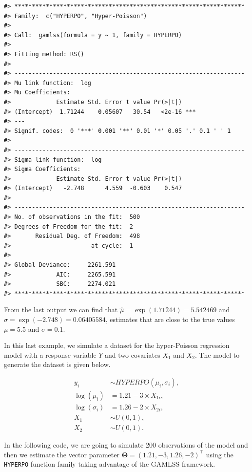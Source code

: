 \begin{verbatim}
#> ******************************************************************
#> Family:  c("HYPERPO", "Hyper-Poisson") 
#> 
#> Call:  gamlss(formula = y ~ 1, family = HYPERPO) 
#> 
#> Fitting method: RS() 
#> 
#> ------------------------------------------------------------------
#> Mu link function:  log
#> Mu Coefficients:
#>             Estimate Std. Error t value Pr(>|t|)    
#> (Intercept)  1.71244    0.05607   30.54   <2e-16 ***
#> ---
#> Signif. codes:  0 '***' 0.001 '**' 0.01 '*' 0.05 '.' 0.1 ' ' 1
#> 
#> ------------------------------------------------------------------
#> Sigma link function:  log
#> Sigma Coefficients:
#>             Estimate Std. Error t value Pr(>|t|)
#> (Intercept)   -2.748      4.559  -0.603    0.547
#> 
#> ------------------------------------------------------------------
#> No. of observations in the fit:  500 
#> Degrees of Freedom for the fit:  2
#>       Residual Deg. of Freedom:  498 
#>                       at cycle:  1 
#>  
#> Global Deviance:     2261.591 
#>             AIC:     2265.591 
#>             SBC:     2274.021 
#> ******************************************************************
\end{verbatim}

From the last output we can find that \(\hat{\mu}=\exp(1.71244)=5.542469\) and \(\hat{\sigma}=\exp(-2.748)=0.06405584\), estimates that are close to the true values \(\mu=5.5\) and \(\sigma=0.1\).

In this last example, we simulate a dataset for the hyper-Poisson regression model with a response variable \(Y\) and two covariates \(X_1\) and \(X_2\). The model to generate the dataset is given below.

\begin{equation}
    \begin{split}
        y_i &\sim HYPERPO(\mu _i, \sigma_i), \\
        \log(\mu_i) &= 1.21 - 3 \times X_{1i}, \\
        \log(\sigma_i) &= 1.26 - 2\times X_{2i},\\
        X_1 &\sim U(0, 1), \\
        X_2 &\sim U(0, 1).
    \end{split}
\label{eq:example3}
\end{equation}

In the following code, we are going to simulate 200 observations of the model and then we estimate the vector parameter \(\boldsymbol{\Theta}=(1.21, -3, 1.26, -2)^\top\) using the \texttt{HYPERPO} function family taking advantage of the GAMLSS framework.

